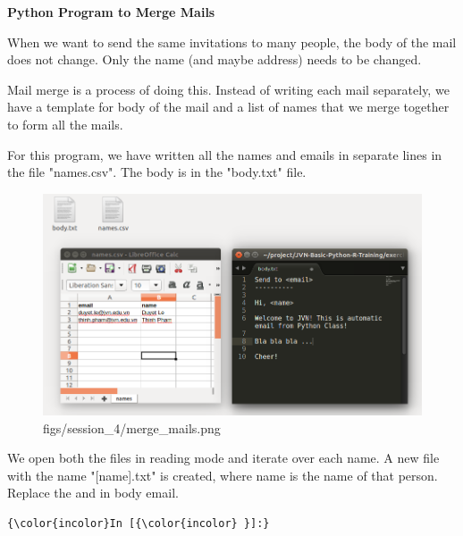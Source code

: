 \documentclass[11pt]{article}
\makeatletter
\def\maxwidth{\ifdim\Gin@nat@width>\linewidth\linewidth
    \else\Gin@nat@width\fi}
\let\Oldincludegraphics\includegraphics
\renewcommand{\includegraphics}[1]{\Oldincludegraphics[width=.8\maxwidth]{#1}}
\makeatother
\begin{document}
\textbf{Python Program to Merge Mails}

When we want to send the same invitations to many people, the body of
the mail does not change. Only the name (and maybe address) needs to be
changed.

Mail merge is a process of doing this. Instead of writing each mail
separately, we have a template for body of the mail and a list of names
that we merge together to form all the mails.

For this program, we have written all the names and emails in separate
lines in the file "names.csv". The body is in the "body.txt" file.

\begin{figure}
\centering
\includegraphics{figs/session_4/merge_mails.png}
\caption{figs/session\_4/merge\_mails.png}
\end{figure}

We open both the files in reading mode and iterate over each name. A new
file with the name "{[}name{]}.txt" is created, where name is the name
of that person. Replace the and in body email.

    \begin{Verbatim}[commandchars=\\\{\}]
{\color{incolor}In [{\color{incolor} }]:} 
\end{Verbatim}


    
    
    
    
\end{document}
